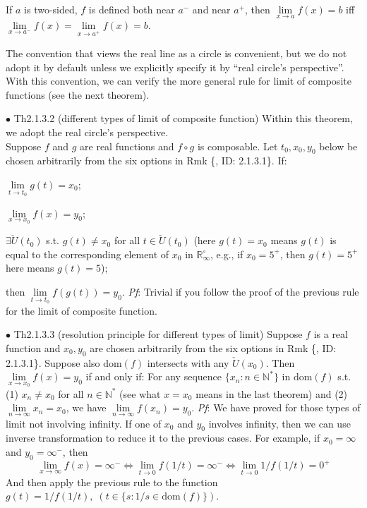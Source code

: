 \documentclass{article}
\begin{document}
\begin{Rmk}{}
{\begin{compactenum}
        \item If $a$ is two-sided, $f$ is defined both near $a^-$ and near $a^+$, then $\lim\limits_{x\to a} f(x)=b$ iff $\lim\limits_{x\to a^-} f(x) = \lim\limits_{x\to a^+} f(x) = b$.
    \end{compactenum}}
    The convention that views the real line as a circle is convenient, but we do not adopt it by default unless we explicitly specify it by \textcolor{Df}{``real circle's perspective''}. With this convention, we can verify the more general rule for limit of composite functions (see the next theorem).
\end{Rmk}

\begin{Th}{$\bullet$ Th2.1.3.2 (different types of limit of composite function)}
    Within this theorem, we adopt the real circle's perspective.\\
    Suppose $f$ and $g$ are real functions and $f\circ g$ is composable. Let $t_0, x_0, y_0$ below be chosen arbitrarily from the six options in Rmk \{, ID: 2.1.3.1\}. If:
    \begin{compactenum}
        \item $\lim\limits_{t\rightarrow t_0} g(t) = x_0$;
        \item $\lim\limits_{x\rightarrow x_0} f(x) = y_0$;
        \item $\exists \check{U}(t_0)$ s.t. $g(t)\neq x_0$ for all $t\in\check{U}(t_0)$ (here $g(t)=x_0$ means $g(t)$ is equal to the corresponding element of $x_0$ in $\mathbb{R}_\infty^\circ$, e.g., if $x_0 = 5^+$, then $g(t) = 5^+$ here means $g(t)=5$);
    \end{compactenum}
    then $\lim\limits_{t\rightarrow t_0} f(g(t)) = y_0$.
    \tcblower
    \textit{Pf}: Trivial if you follow the proof of the previous rule for the limit of composite function.
\end{Th}

\begin{Th}{$\bullet$ Th2.1.3.3 (resolution principle for different types of limit)}
    Suppose $f$ is a real function and $x_0, y_0$ are chosen arbitrarily from the six options in Rmk \{, ID: 2.1.3.1\}. Suppose also $\text{dom}(f)$ intersects with any $\check{U}(x_0)$. Then $\lim\limits_{x\to x_0} f(x) = y_0$ if and only if:
    For any sequence $\{x_n: n\in\mathbb{N^\ast}\}$ in $\text{dom}(f)$ s.t. (1) $x_n\neq x_0$ for all $n\in\mathbb{N^\ast}$ (see what $x=x_0$ means in the last theorem) and (2) $\lim\limits_{n\to\infty} x_n = x_0$, we have $\lim\limits_{n\to\infty} f(x_n) = y_0$.
    \tcblower
    \textit{Pf}: We have proved for those types of limit not involving infinity. If one of $x_0$ and $y_0$ involves infinity, then we can use inverse transformation to reduce it to the previous cases. For example, if $x_0 = \infty$ and $y_0 = \infty^-$, then
    $$ \lim\limits_{x\to\infty} f(x) = \infty^- \Leftrightarrow \lim\limits_{t\to 0} f(1/t) = \infty^- \Leftrightarrow \lim\limits_{t\to 0} 1/f(1/t) = 0^+$$
    And then apply the previous rule to the function $g(t) = 1/f(1/t),\; (t\in \{s: 1/s\in\text{dom}(f)\})$.
\end{Th}
\end{document}
